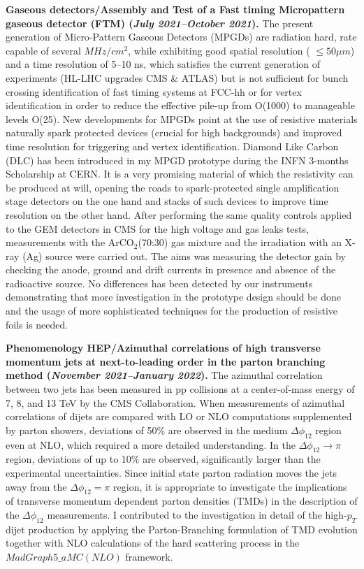 \documentclass[11pt]{res}
\begin{document}
\begin{resume}
\textbf{Gaseous detectors/Assembly and Test of a Fast timing Micropattern gaseous detector (FTM) \textbf{(\textit{July 2021--October 2021})}.} 
The present generation of Micro-Pattern Gaseous Detectors (MPGDs) are radiation hard, rate capable of several $MHz/cm^{2}$, while exhibiting good spatial resolution ( $\le 50\mu m$) and a time resolution of 5–10 ns, which satisfies the current generation of experiments (HL-LHC upgrades CMS \& ATLAS) but is not sufficient for bunch crossing identification of fast timing systems at FCC-hh or for vertex identification in order to reduce the effective pile-up from O(1000) to manageable levels O(25). New developments for MPGDs point at the use of resistive materials naturally spark protected devices (crucial for high backgrounds) and improved time resolution for triggering and vertex identification. Diamond Like Carbon (DLC) has been introduced in my MPGD prototype during the INFN 3-months Scholarship at CERN. It is a very promising material of which the resistivity can be produced at will, opening the roads to spark-protected single amplification stage detectors on the one hand and stacks of such devices to improve time resolution on the other hand. After performing the same quality controls applied to the GEM detectors in CMS for the high voltage and gas leaks tests, measurements with the ArCO$_{2}$(70:30) gas mixture and the irradiation with an X-ray (Ag) source were carried out. The aims was measuring the detector gain by checking the anode, ground and drift currents in presence and absence of the radioactive source. No differences has been detected by our instruments demonstrating that more investigation in the prototype design should be done and the usage of more sophisticated techniques for the production of resistive foils is needed.

\textbf{Phenomenology HEP/Azimuthal correlations of high transverse momentum jets at next-to-leading order in the parton branching method {(\textit{November 2021--January 2022})}.}
The azimuthal correlation between two jets has been measured in pp collisions at a center-of-mass energy of 7, 8, and 13 TeV by the CMS Collaboration. When measurements of azimuthal correlations of dijets are compared with LO or NLO computations supplemented by parton showers, deviations of 50\% are observed in the medium $\Delta\phi_{12}$ region even at NLO, which required a more detailed understanding. In the $\Delta\phi_{12} \to \pi$ region, deviations of up to 10\% are observed, significantly larger than the experimental uncertainties. Since initial state parton radiation moves the jets away from the $\Delta\phi_{12} = \pi$ region, it is appropriate to investigate the implications of transverse momentum dependent parton densities (TMDs) in the description of the $\Delta\phi_{12}$ measurements. I contributed to the investigation in detail of the high-$p_{T}$ dijet production by applying the Parton-Branching formulation of TMD evolution together with NLO calculations of the hard scattering process in the $MadGraph5\_aMC(NLO)$ framework.


\end{resume}
\end{document}
